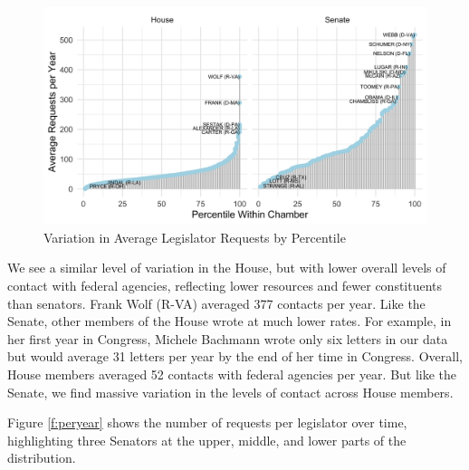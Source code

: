 \documentclass[12pt]{article}
\begin{document}
\begin{figure}
\centering
\caption{Variation in Average Legislator Requests by Percentile} \label{f:contact1} 
\begin{minipage}{\textwidth}
\includegraphics[width = \textwidth]{figs/percentiles-1}
\end{minipage}
\end{figure}


We see a similar level of variation in the House, but with lower overall levels of contact with federal agencies, reflecting lower resources and fewer constituents than senators. Frank Wolf (R-VA) averaged 377 contacts per year. Like the Senate, other members of the House wrote at much lower rates. For example, in her first year in Congress,  Michele Bachmann wrote only six letters in our data but would average 31 letters per year by the end of her time in Congress. Overall, House members averaged 52 contacts with federal agencies per year. But like the Senate, we find massive variation in the levels of contact across House members.  

Figure \ref{f:peryear} shows the number of requests per legislator over time, highlighting three Senators at the upper, middle, and lower parts of the distribution.
\end{document}
